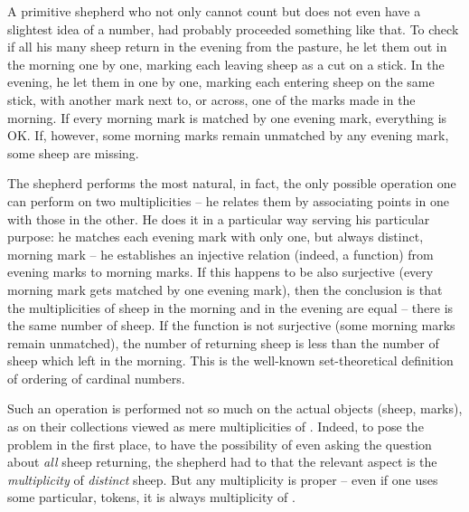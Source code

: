A primitive shepherd who not only cannot count but does not even have a
slightest idea of a number, had probably proceeded something like that.  To
check if all his many sheep return in the evening from the pasture, he let them
out in the morning one by one, marking each leaving sheep as a cut on a stick.
In the evening, he let them in one by one, marking each entering sheep on the
same stick, with another mark next to, or across, one of the marks made in the
morning.  If every morning mark is matched by one evening mark, everything is
OK.  If, however, some morning marks remain unmatched by any evening mark, some
sheep are missing.

The shepherd performs the most natural, in fact, the only possible operation one
can perform on two  multiplicities -- he relates them by associating
points in one with those in the other.  He does it in a particular way serving
his particular purpose: he matches each evening mark with only one, but always
distinct, morning mark -- he establishes an injective relation (indeed, a
function) from evening marks to morning marks.  If this happens to be also
surjective (every morning mark gets matched by one evening mark), then the
conclusion is that the multiplicities of sheep in the morning and in the evening
are equal -- there is the same number of sheep.  If the function is not
surjective (some morning marks remain unmatched), the number of returning sheep
is less than the number of sheep which left in the morning.  This is the
well-known set-theoretical definition of ordering of cardinal numbers.

Such an operation is performed not so much on the actual objects (sheep, marks),
as on their collections viewed as mere multiplicities of .
Indeed, to pose the problem in the first place, to have the possibility of even
asking the question about {\em all} sheep returning, the shepherd had to
 that the relevant aspect is the {\em multiplicity} of {\em
  distinct} sheep.  But any multiplicity is proper -- even if one uses some
particular,  tokens, it is always multiplicity of .

